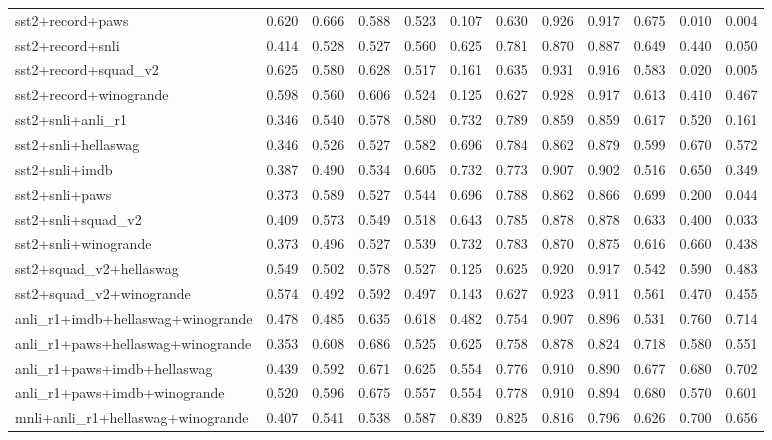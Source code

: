 \begin{table}[t]
\begin{tabular}{lrrrrrrrrrrr}
    sst2+record+paws & 0.620 & 0.666 & 0.588 & 0.523 & 0.107 & 0.630 & 0.926 & 0.917 & 0.675 & 0.010 & 0.004 \\
    sst2+record+snli & 0.414 & 0.528 & 0.527 & 0.560 & 0.625 & 0.781 & 0.870 & 0.887 & 0.649 & 0.440 & 0.050 \\
    sst2+record+squad\_v2 & 0.625 & 0.580 & 0.628 & 0.517 & 0.161 & 0.635 & 0.931 & 0.916 & 0.583 & 0.020 & 0.005 \\
    sst2+record+winogrande & 0.598 & 0.560 & 0.606 & 0.524 & 0.125 & 0.627 & 0.928 & 0.917 & 0.613 & 0.410 & 0.467 \\
    sst2+snli+anli\_r1 & 0.346 & 0.540 & 0.578 & 0.580 & 0.732 & 0.789 & 0.859 & 0.859 & 0.617 & 0.520 & 0.161 \\
    sst2+snli+hellaswag & 0.346 & 0.526 & 0.527 & 0.582 & 0.696 & 0.784 & 0.862 & 0.879 & 0.599 & 0.670 & 0.572 \\
    sst2+snli+imdb & 0.387 & 0.490 & 0.534 & 0.605 & 0.732 & 0.773 & 0.907 & 0.902 & 0.516 & 0.650 & 0.349 \\
    sst2+snli+paws & 0.373 & 0.589 & 0.527 & 0.544 & 0.696 & 0.788 & 0.862 & 0.866 & 0.699 & 0.200 & 0.044 \\
    sst2+snli+squad\_v2 & 0.409 & 0.573 & 0.549 & 0.518 & 0.643 & 0.785 & 0.878 & 0.878 & 0.633 & 0.400 & 0.033 \\
    sst2+snli+winogrande & 0.373 & 0.496 & 0.527 & 0.539 & 0.732 & 0.783 & 0.870 & 0.875 & 0.616 & 0.660 & 0.438 \\
    sst2+squad\_v2+hellaswag & 0.549 & 0.502 & 0.578 & 0.527 & 0.125 & 0.625 & 0.920 & 0.917 & 0.542 & 0.590 & 0.483 \\
    sst2+squad\_v2+winogrande & 0.574 & 0.492 & 0.592 & 0.497 & 0.143 & 0.627 & 0.923 & 0.911 & 0.561 & 0.470 & 0.455 \\
    \addlinespace
    anli\_r1+imdb+hellaswag+winogrande & 0.478 & 0.485 & 0.635 & 0.618 & 0.482 & 0.754 & 0.907 & 0.896 & 0.531 & 0.760 & 0.714 \\
    anli\_r1+paws+hellaswag+winogrande & 0.353 & 0.608 & 0.686 & 0.525 & 0.625 & 0.758 & 0.878 & 0.824 & 0.718 & 0.580 & 0.551 \\
    anli\_r1+paws+imdb+hellaswag & 0.439 & 0.592 & 0.671 & 0.625 & 0.554 & 0.776 & 0.910 & 0.890 & 0.677 & 0.680 & 0.702 \\
    anli\_r1+paws+imdb+winogrande & 0.520 & 0.596 & 0.675 & 0.557 & 0.554 & 0.778 & 0.910 & 0.894 & 0.680 & 0.570 & 0.601 \\
    mnli+anli\_r1+hellaswag+winogrande & 0.407 & 0.541 & 0.538 & 0.587 & 0.839 & 0.825 & 0.816 & 0.796 & 0.626 & 0.700 & 0.656 \\

\end{tabular}
\end{table}
